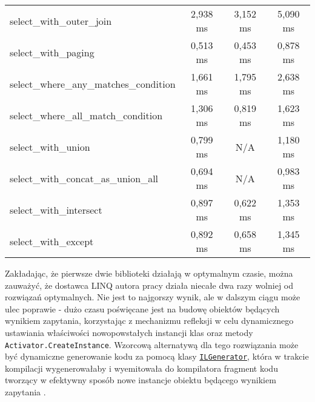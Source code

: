 \begin{table}[h]
\begin{tabular}{l|ccc}
select\_with\_outer\_join              & 2,938 ms             & 3,152 ms         & 5,090 ms              \\
select\_with\_paging                   & 0,513 ms             & 0,453 ms         & 0,878 ms              \\
select\_where\_any\_matches\_condition & 1,661 ms             & 1,795 ms         & 2,638 ms              \\
select\_where\_all\_match\_condition   & 1,306 ms             & 0,819 ms         & 1,623 ms              \\
select\_with\_union                    & 0,799 ms             & N/A              & 1,180 ms              \\
select\_with\_concat\_as\_union\_all   & 0,694 ms             & N/A              & 0,983 ms              \\
select\_with\_intersect                & 0,897 ms             & 0,622 ms         & 1,353 ms              \\
select\_with\_except                   & 0,892 ms             & 0,658 ms         & 1,345 ms  
\end{tabular}
\end{table}

\pagebreak

Zakładając, że pierwsze dwie biblioteki działają w optymalnym czasie, można zauważyć, że dostawca LINQ autora pracy działa niecałe dwa razy wolniej od rozwiązań optymalnych. Nie jest to najgorszy wynik, ale w dalszym ciągu może ulec poprawie - dużo czasu poświęcane jest na budowę obiektów będących wynikiem zapytania, korzystając z mechanizmu refleksji w celu dynamicznego ustawiania właściwości nowopowstałych instancji klas oraz metody \texttt{Activator.CreateInstance}. Wzorcową alternatywą dla tego rozwiązania może być dynamiczne generowanie kodu za pomocą klasy \href{https://msdn.microsoft.com/pl-pl/library/system.reflection.emit.ilgenerator(v=vs.110).aspx}{\texttt{ILGenerator}}, która w trakcie kompilacji wygenerowałaby i wyemitowała do kompilatora fragment kodu tworzący w efektywny sposób nowe instancje obiektu będącego wynikiem zapytania \cite{il_generator}.